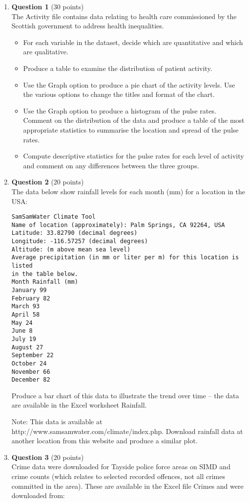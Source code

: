 \documentclass[12pt]{article}
\begin{document}
\begin{enumerate}

\item \textbf{Question 1} (30 points) \\
The Activity file contains data relating to health care commissioned by the Scottish government to address health inequalities.
\begin{itemize}
\item For each variable in the dataset, decide which are quantitative and which are qualitative.
\item Produce a table to examine the distribution of patient activity.
\item Use the Graph option to produce a pie chart of the activity levels. Use the various options to change the titles and format of the chart.
\item Use the Graph option to produce a histogram of the pulse rates. Comment on the distribution of the data and produce a table of the most appropriate statistics to summarise the location and spread of the pulse rates.
\item Compute descriptive statistics for the pulse rates for each level of activity and comment on any differences between the three groups.
\end{itemize}


\item \textbf{Question 2} (20 points) \\
The data below show rainfall levels for each month (mm) for a location in the USA:
\begin{verbatim}
SamSamWater Climate Tool
Name of location (approximately): Palm Springs, CA 92264, USA
Latitude: 33.82790 (decimal degrees)
Longitude: -116.57257 (decimal degrees)
Altitude: (m above mean sea level)
Average precipitation (in mm or liter per m) for this location is listed
in the table below.
Month Rainfall (mm)
January 99
February 82
March 93
April 58
May 24
June 8
July 19
August 27
September 22
October 24
November 66
December 82
\end{verbatim}
Produce a bar chart of this data to illustrate the trend over time – the data are available in the Excel worksheet Rainfall.

Note: This data is available at http://www.samsamwater.com/climate/index.php.
Download rainfall data at another location from this website and produce a similar plot.

\item \textbf{Question 3} (20 points) \\
Crime data were downloaded for Tayside police force areas on SIMD and crime counts (which relates to selected recorded offences, not all crimes committed in the area). These are available in the Excel file Crimes and were downloaded from:


\end{enumerate}
\end{document}
